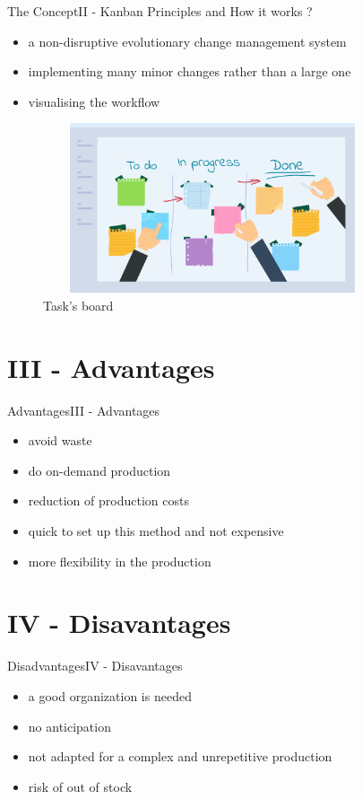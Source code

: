 \documentclass[10pt]{beamer}
\newcommand{\PII}{II - Kanban Principles and How it works ?}
\newcommand{\PIII}{III - Advantages}
\newcommand{\PIV}{IV - Disavantages}
\begin{document}
\begin{frame}{The Concept}{\PII}
    \begin{itemize}
        \item a non-disruptive evolutionary change management system
        \item implementing many minor changes rather than a large one
        \item visualising the workflow
    \end{itemize}
     \begin{figure}
      \centering
   \includegraphics[width=10cm, height=5cm]{ph.png}
      \caption{Task's board}
     \end{figure}
\end{frame}

\section{\PIII} 
\begin{frame}{Advantages}{\PIII}
    \begin{itemize}
        \item avoid waste
        \item do on-demand production
        \item reduction of production costs
        \item quick to set up this method and not expensive
        \item more flexibility in the production
    \end{itemize}

\end{frame}

\section{\PIV} 
\begin{frame}{Disadvantages}{\PIV}
    \begin{itemize}
        \item a good organization is needed
        \item no anticipation
        \item not adapted for a complex and unrepetitive production
        \item risk of out of stock
    \end{itemize}
\end{frame}
\end{document}
